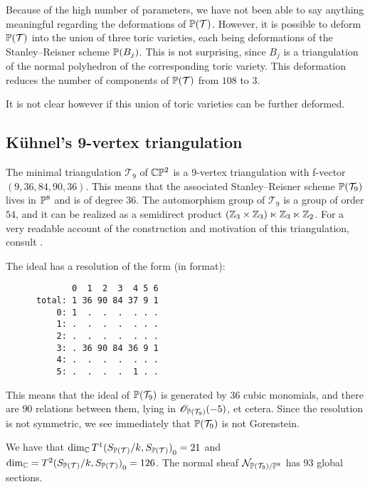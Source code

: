 Because of the high number of parameters, we have not been able to say anything meaningful regarding the deformations of $\P(\mathcal T)$. However, it is possible to deform $\P(\mathcal T)$ into the union of three toric varieties, each being deformations of the Stanley--Reisner scheme $\P(B_j)$. This is not surprising, since $B_j$ is a triangulation of the normal polyhedron of the corresponding toric variety. This deformation reduces the number of components of $\P(\mathcal T)$ from $108$ to $3$.

It is not clear however if this union of toric varieties can be further deformed.

\subsection{Kühnel's 9-vertex triangulation}

The minimal triangulation $\mathcal T_9$ of $\C \P^2$ is a 9-vertex triangulation with f-vector $(9,36,84,90,36)$. This means that the associated Stanley--Reisner scheme $\P(\mathcal T_9)$ lives in $\P^8$ and is of degree $36$. The automorphism group of $\mathcal T_9$ is a group of order $54$, and it can be realized as a semidirect product $(\Z_3 \times \Z_3) \ltimes \Z_3 \ltimes \Z_2$. For a very readable account of the construction and motivation of this triangulation, consult \cite{kuhnel_9vertex}.

The ideal has a resolution of the form (in \MM format):

\begin{verbatim}
             0  1  2  3  4 5 6
      total: 1 36 90 84 37 9 1
          0: 1  .  .  .  . . .
          1: .  .  .  .  . . .
          2: .  .  .  .  . . .
          3: . 36 90 84 36 9 1
          4: .  .  .  .  . . .
          5: .  .  .  .  1 . .
\end{verbatim}

This means that the ideal of $\P(\mathcal T_9)$ is generated by $36$ cubic monomials, and there are $90$ relations between them, lying in $\OO_{\P(\mathcal T_9)}(-5)$, et cetera. Since the resolution is not symmetric, we see immediately that $\P(\mathcal T_9)$ is not Gorenstein.

\begin{proposition}
We have that $\dim_\C  {T^1(S_{\P(\mathcal T)}/k, S_{\P(\mathcal T)})}_0=21$ and $\dim_\C = {T^2(S_{\P(\mathcal T)}/k, S_{\P(\mathcal T)})}_0=126$. The normal sheaf $\mathcal N_{\P(\mathcal T_9)/\P^{8}}$ has $93$ global sections.
\end{proposition}

